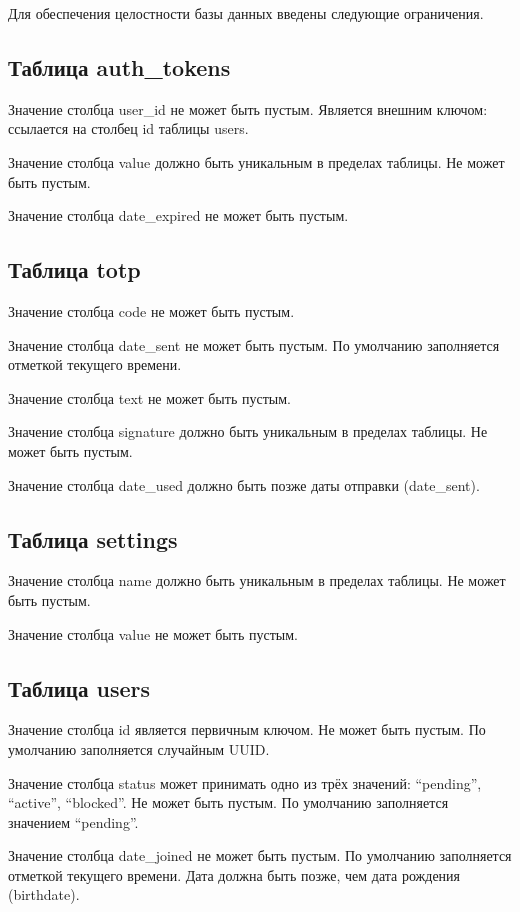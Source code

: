 Для обеспечения целостности базы данных введены следующие ограничения.

\subsection{Таблица auth\_tokens}

Значение столбца user\_id не может быть пустым. Является внешним ключом: ссылается на столбец id таблицы users.

Значение столбца value должно быть уникальным в пределах таблицы. Не может быть пустым.

Значение столбца date\_expired не может быть пустым.

\subsection{Таблица totp}

Значение столбца code не может быть пустым.

Значение столбца date\_sent не может быть пустым. По умолчанию заполняется отметкой текущего времени.

Значение столбца text не может быть пустым.

Значение столбца signature должно быть уникальным в пределах таблицы. Не может быть пустым.

Значение столбца date\_used должно быть позже даты отправки (date\_sent).

\subsection{Таблица settings}

Значение столбца name должно быть уникальным в пределах таблицы. Не может быть пустым.

Значение столбца value не может быть пустым.

\subsection{Таблица users}

Значение столбца id является первичным ключом. Не может быть пустым. По умолчанию заполняется случайным UUID.

Значение столбца status может принимать одно из трёх значений: \enquote{pending}, \enquote{active}, \enquote{blocked}. Не может быть пустым. По умолчанию заполняется значением \enquote{pending}.

Значение столбца date\_joined не может быть пустым. По умолчанию заполняется отметкой текущего времени. Дата должна быть позже, чем дата рождения (birthdate).

